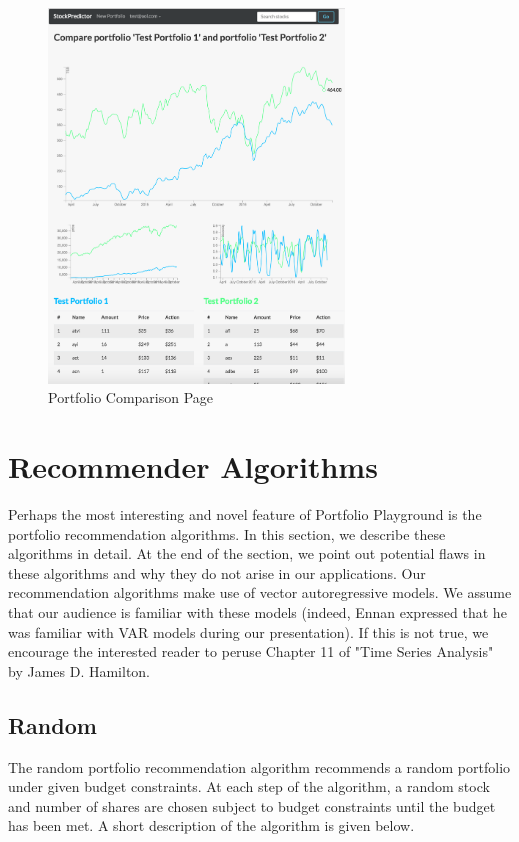 \documentclass{article}
\begin{document}
\begin{figure}[H]
\begin{center}
\includegraphics[width=0.7\textwidth]{compare}
\caption{\label{fig:comparison} Portfolio Comparison Page}
\end{center}
\end{figure}

\section{Recommender Algorithms} \label{sec:alg}
Perhaps the most interesting and novel feature of Portfolio Playground is the portfolio recommendation algorithms. In this section, we describe these algorithms in detail. At the end of the section, we point out potential flaws in these algorithms and why they do not arise in our applications. Our recommendation algorithms make use of vector autoregressive models. We assume that our audience is familiar with these models (indeed, Ennan expressed that he was familiar with VAR models during our presentation). If this is not true, we encourage the interested reader to peruse Chapter 11 of "Time Series Analysis" by James D. Hamilton.

\subsection{Random}
The random portfolio recommendation algorithm recommends a random portfolio under given budget constraints. At each step of the algorithm, a random stock and number of shares are chosen subject to budget constraints until the budget has been met. A short description of the algorithm is given below.
\end{document}
